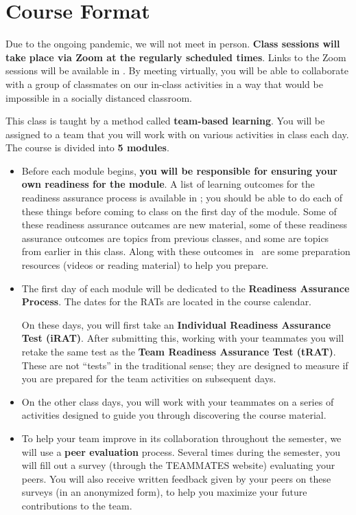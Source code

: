 \documentclass{article}
\begin{document}
\section*{\fontsize{12}{15}\selectfont Course Format}
Due to the ongoing pandemic, we will not meet in person. \textbf{Class sessions will take place via Zoom at the regularly scheduled times}. Links to the Zoom sessions will be available in \LMS. By meeting virtually, you will be able to collaborate with a group of classmates on our in-class activities in a way that would be impossible in a socially distanced classroom.

    This class is taught by a method called {\bf team-based learning}.  You will be assigned to a team that you will work with on various activities in class each day.  The course is divided into {\bf 5 modules}.
    \begin{itemize}
    \item Before each module begins, {\bf you will be responsible for ensuring your own readiness for the module}.  A list of learning outcomes for the readiness assurance process is available in \LMS; you should be able to do each of these things before coming to class on the first day of the module.  Some of these readiness assurance outcames are new material, some of these readiness assurance outcomes are topics from previous classes, and some are topics from earlier in this class.  Along with these outcomes in \LMS\ are some preparation resources (videos or reading material) to help you prepare.
    \item The first day of each module will be dedicated to the {\bf Readiness Assurance Process}.  The dates for the RATs are located in the course calendar.


    On these days, you will first take an {\bf Individual Readiness Assurance Test (iRAT)}.  After submitting this, working with your teammates you will retake the same test as the {\bf Team Readiness Assurance Test (tRAT)}.  These are not ``tests'' in the traditional sense; they are designed to measure if you are prepared for the team activities on subsequent days.

    \item On the other class days, you will work with your teammates on a series of activities designed to guide you through discovering the course material.

    \item To help your team improve in its collaboration throughout the semester, we will use a {\bf peer evaluation} process.  Several times during the semester, you will fill out a  survey (through the TEAMMATES website) evaluating your peers.  
    You will also receive written feedback given by your peers on these surveys (in an anonymized form), to help you maximize your future contributions to the team.

    \end{itemize}
\end{document}
